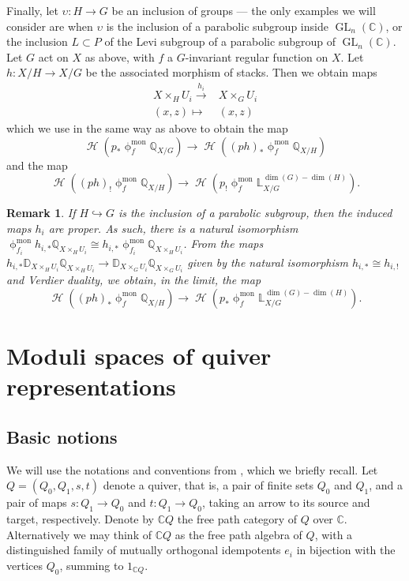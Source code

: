 \documentclass[a4paper,10pt]{amsart}
\renewcommand{\phi}{\upphi}
\newtheorem{remark}[theorem]{Remark}
\newcommand{\DD}{\mathbb{D}}
\newcommand{\QQ}{\mathbb{Q}}
\newcommand{\phim}[1]{\phi^{\mon}_{#1}}
\DeclareMathOperator{\mon}{mon}
\DeclareMathOperator{\Gl}{GL}
\DeclareMathOperator{\Ho}{\mathcal{H}}
\begin{document}
Finally, let $\upsilon\colon H\rightarrow G$ be an inclusion of groups --- the only examples we will consider are when $\upsilon$ is the inclusion of a parabolic subgroup inside $\Gl_n(\mathbb{C})$, or the inclusion $L\subset P$ of the Levi subgroup of a parabolic subgroup of $\Gl_n(\mathbb{C})$.  Let $G$ act on $X$ as above, with $f$ a $G$-invariant regular function on $X$.  Let $h\colon X/H\rightarrow X/G$ be the associated morphism of stacks.  Then we obtain maps 
\begin{align*}
X\times_H U_i\xrightarrow{h_i} &X\times_G U_i\\
(x,z)\mapsto&(x,z)
\end{align*}
which we use in the same way as above to obtain the map
\[
\Ho\left(p_*\phim{f}\mathbb{Q}_{X/G}\right)\rightarrow\Ho\left((p h)_*\phim{f}\mathbb{Q}_{X/H}\right)
\]
and the map 
\[
\Ho\left((p h)_!\phim{f}\mathbb{Q}_{X/H}\right)\rightarrow \Ho\left(p_!\phim{f}\mathbb{L}^{\dim(G)-\dim(H)}_{X/G}\right).  
\]
\begin{remark}
\label{limKer}
If $H\hookrightarrow G$ is the inclusion of a parabolic subgroup, then the induced maps $h_i$ are proper.  As such, there is a natural isomorphism $\phim{f_i}h_{i,*}\QQ_{X\times_H U_i}\cong h_{i,*}\phim{f_i}\QQ_{X\times_H U_i}$.  From the maps $h_{i,*}\DD_{X\times_H U_i}\mathbb{Q}_{X\times_H U_i}\rightarrow \DD_{X\times_G U_{i}}\mathbb{Q}_{X\times_G U_{i}}$ given by the natural isomorphism $h_{i,*}\cong h_{i,!}$ and Verdier duality, we obtain, in the limit, the map 
\[
\Ho\left((ph)_*\phim{f}\mathbb{Q}_{X/H}\right)\rightarrow \Ho\left(p_*\phim{f}\mathbb{L}^{\dim(G)-\dim(H)}_{X/G}\right).
\]
\end{remark}


\section{Moduli spaces of quiver representations}
\label{Qrepsection}
\subsection{Basic notions}\label{Bassection}We will use the notations and conventions from \cite{DaMe4}, which we briefly recall.  Let $Q=(Q_0,Q_1,s,t)$ denote a quiver, that is, a pair of finite sets $Q_0$ and $Q_1$, and a pair of maps $s\colon Q_1\rightarrow Q_0$ and $t\colon Q_1\rightarrow Q_0$, taking an arrow to its source and target, respectively.  Denote by $\mathbb{C} Q$ the free path category of $Q$ over $\mathbb{C}$.  Alternatively we may think of $\mathbb{C} Q$ as the free path algebra of $Q$, with a distinguished family of mutually orthogonal idempotents $e_i$ in bijection with the vertices $Q_0$, summing to $1_{\mathbb{C} Q}$.
\smallbreak
\end{document}

